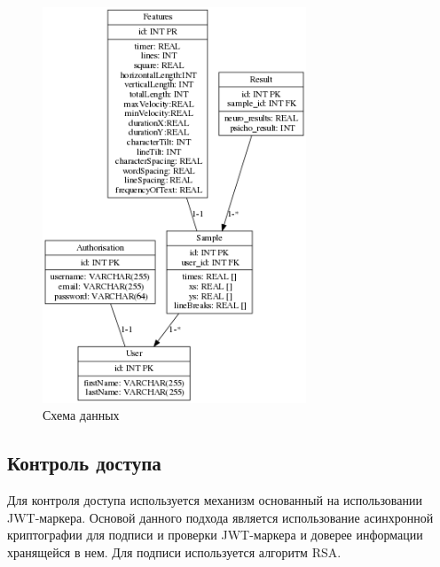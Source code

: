 \begin{figure}[!ht]
    \centering
    \includegraphics[width=0.7\textwidth]{figures/dataDiagram.png}
    \caption{Схема данных}
    \label{fig:develoipment:data_base}
\end{figure}





\subsection{Контроль доступа}
\label{sec:development:access_control}
Для контроля доступа используется механизм основанный на использовании JWT-маркера. Основой данного подхода является использование асинхронной криптографии для подписи и проверки JWT-маркера и доверее информации хранящейся в нем. Для подписи используется алгоритм RSA.

